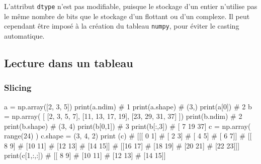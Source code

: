 \documentclass[10pt,fleqn]{article} %
\begin{document}
L'attribut \texttt{dtype} n'est pas modifiable, puisque le stockage
d'un entier n'utilise pas le même nombre de bits que le stockage d'un
flottant ou d'un complexe. Il peut cependant être imposé à la création
du tableau \texttt{numpy}, pour éviter le casting automatique.
%
%

\subsection{Lecture dans un tableau}

\subsubsection{Slicing}
\begin{py}
\begin{multicols}{4}
  \begin{python}
a = np.array([2, 3, 5])
print(a.ndim)
# 1
print(a.shape)
# (3,)
print(a[0]) # 2
b = np.array(
 [ [2, 3, 5, 7],
 [11, 13, 17, 19],
 [23, 29, 31, 37] ])
print(b.ndim)
# 2
print(b.shape)
# (3, 4)
print(b[0,1])
# 3
print(b[:,3])
# [ 7 19 37]    
c = np.array( range(24) )
c.shape = (3, 4, 2)
print (c)
# [[[ 0  1]
#   [ 2  3]
#   [ 4  5]
#   [ 6  7]]
#  [[ 8  9]
#   [10 11]
#   [12 13]
#   [14 15]]
#  [[16 17]
#   [18 19]
#   [20 21]
#   [22 23]]]
print(c[1,:,:])
# [[ 8  9]
#  [10 11]
#  [12 13]
#  [14 15]]    
\end{python}
\end{multicols}
\end{py}
\end{document}
